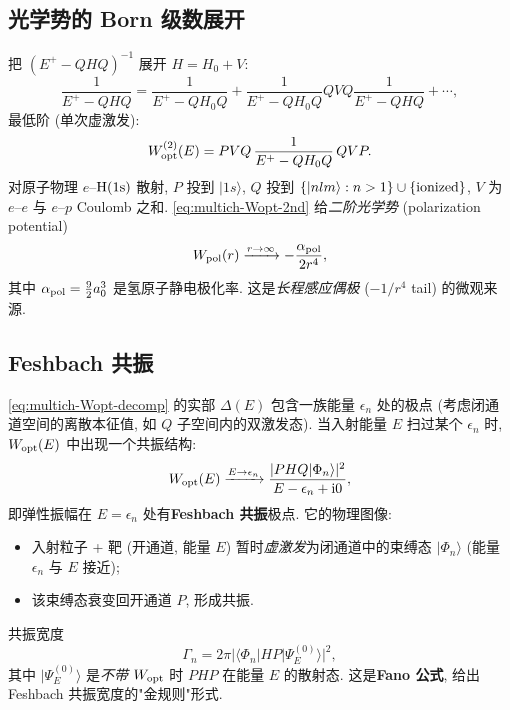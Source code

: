 \subsection{光学势的 Born 级数展开}\label{sec:multich-Wopt-Born}

把 $(E^+-QHQ)^{-1}$ 展开 $H=H_0+V$:
\begin{equation}
  \frac{1}{E^+-QHQ}=\frac{1}{E^+-QH_0Q}+\frac{1}{E^+-QH_0Q}QVQ\frac{1}{E^+-QHQ}+\cdots,
\end{equation}
最低阶 (单次虚激发):
\begin{equation}
  W_{\rm opt}^{(2)}(E)=PVQ\,\frac{1}{E^+-QH_0Q}\,QVP.
  \label{eq:multich-Wopt-2nd}
\end{equation}
对原子物理 $e$--$\rm H(1s)$ 散射, $P$ 投到 $|1s\rangle$, $Q$ 投到 $\{|nlm\rangle:n>1\}\cup\{\rm ionized\}$, $V$ 为 $e$--$e$ 与 $e$--$p$ Coulomb 之和. \eqref{eq:multich-Wopt-2nd} 给\emph{二阶光学势} (polarization potential)
\begin{equation}
  W_{\rm pol}(r)\xrightarrow{r\to\infty}-\frac{\alpha_{\rm pol}}{2r^4},
\end{equation}
其中 $\alpha_{\rm pol}=\frac{9}{2}a_0^3$ 是氢原子静电极化率. 这是\emph{长程感应偶极} ($-1/r^4$ tail) 的微观来源.

\subsection{Feshbach 共振}\label{sec:multich-Feshbach-res}

\eqref{eq:multich-Wopt-decomp} 的实部 $\Delta(E)$ 包含一族能量 $\epsilon_n$ 处的极点 (考虑闭通道空间的离散本征值, 如 $Q$ 子空间内的双激发态). 当入射能量 $E$ 扫过某个 $\epsilon_n$ 时, $W_{\rm opt}(E)$ 中出现一个共振结构:
\begin{equation}
  W_{\rm opt}(E)\xrightarrow{E\to\epsilon_n}\frac{|PHQ|\Phi_n\rangle|^2}{E-\epsilon_n+\mathrm{i} 0},
\end{equation}
即弹性振幅在 $E=\epsilon_n$ 处有\textbf{Feshbach 共振}极点. 它的物理图像:
\begin{itemize}
  \item 入射粒子 + 靶 (开通道, 能量 $E$) 暂时\emph{虚激发}为闭通道中的束缚态 $|\Phi_n\rangle$ (能量 $\epsilon_n$ 与 $E$ 接近);
  \item 该束缚态衰变回开通道 $P$, 形成共振.
\end{itemize}
共振宽度
\begin{equation}
  \Gamma_n=2\pi\bigl|\langle\Phi_n|HP|\Psi_E^{(0)}\rangle\bigr|^2,
  \label{eq:multich-Fano}
\end{equation}
其中 $|\Psi_E^{(0)}\rangle$ 是\emph{不带 $W_{\rm opt}$} 时 $PHP$ 在能量 $E$ 的散射态. 这是\textbf{Fano 公式}, 给出 Feshbach 共振宽度的"金规则"形式.

